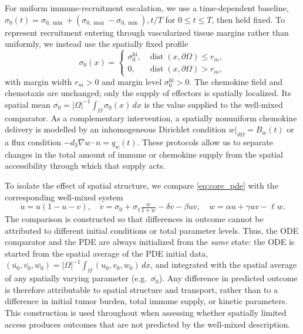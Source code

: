 \documentclass[]{interact}
\theoremstyle{plain}%
\theoremstyle{definition}
\theoremstyle{remark}
\newcommand{\Om}{\Omega}
\begin{document}
For uniform immune-recruitment escalation, we use a time-dependent baseline,
$\sigma_0(t)=\sigma_{0,\min}+(\sigma_{0,\max}-\sigma_{0,\min}),t/T$ for
$0\le t\le T$, then held fixed. To represent recruitment entering through
vascularized tissue margins rather than uniformly, we instead use the spatially
fixed profile
\begin{equation}
\label{eq:sigma0_margin}
\sigma_0(x)=
\begin{cases}
\sigma_0^{\mathrm{hi}}, & \operatorname{dist}(x,\partial\Om)\le r_m,\\
0, & \operatorname{dist}(x,\partial\Om)>r_m,
\end{cases}
\end{equation}
with margin width $r_m>0$ and margin level $\sigma_0^{\mathrm{hi}}>0$. The
chemokine field and chemotaxis are unchanged; only the supply of effectors is
spatially localized. Its spatial mean
$\overline{\sigma_0}=|\Om|^{-1}\int_\Om\sigma_0(x)\,dx$ is the value supplied to
the well-mixed comparator. As a complementary intervention, a spatially
nonuniform chemokine delivery is modelled by an inhomogeneous Dirichlet
condition $w|_{\partial\Om}=B_w(t)$ or a flux condition
$-d_3\nabla w\cdot n=q_w(t)$. These protocols allow us to separate changes in
the total amount of immune or chemokine supply from the spatial accessibility
through which that supply acts.

To isolate the effect of spatial structure, we compare \eqref{eq:core_pde} with
the corresponding well-mixed system
\begin{equation}
\label{eq:ode_comparator}
\dot u = u(1-u-v),\quad
\dot v = \sigma_0+\sigma_1\tfrac{w}{1+w}-\delta v-\beta uv,\quad
\dot w = \alpha u+\gamma uv-\ell w.
\end{equation}
The comparison is constructed so that differences in outcome cannot be
attributed to different initial conditions or total parameter levels. Thus,
the ODE comparator and the PDE are always initialized from the \emph{same}
state: the ODE is started from the spatial average of the PDE initial data,
$(\overline{u_0},\overline{v_0},\overline{w_0})
=|\Om|^{-1}\int_\Om(u_0,v_0,w_0)\,dx$, and integrated with the spatial average
of any spatially varying parameter (e.g.\ $\overline{\sigma_0}$). Any difference
in predicted outcome is therefore attributable to spatial structure and
transport, rather than to a difference in initial tumor burden, total immune
supply, or kinetic parameters. This construction is used throughout when
assessing whether spatially limited access produces outcomes that are not
predicted by the well-mixed description.
\end{document}
